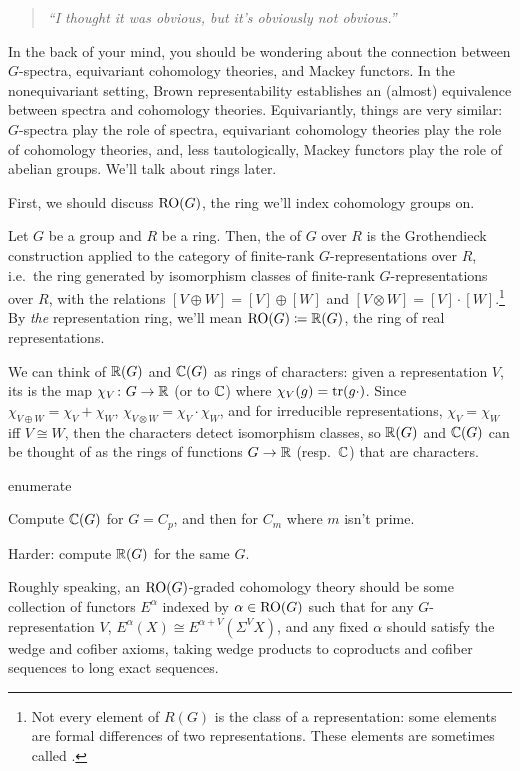 \begin{quote}\textit{
	``I thought it was obvious, but it's obviously not obvious.''
}\end{quote}
In the back of your mind, you should be wondering about the connection between $G$-spectra, equivariant cohomology
theories, and Mackey functors. In the nonequivariant setting, Brown representability establishes an (almost)
equivalence between spectra and cohomology theories. Equivariantly, things are very similar: $G$-spectra play the
role of spectra, equivariant cohomology theories play the role of cohomology theories, and, less tautologically,
Mackey functors play the role of abelian groups. We'll talk about rings later.

First, we should discuss $\mathrm{RO}(G)$, the ring we'll index cohomology groups on.
\begin{defn}
Let $G$ be a group and $R$ be a ring. Then, the  of $G$ over $R$ is the Grothendieck
construction applied to the category of finite-rank $G$-representations over $R$, i.e.\ the ring generated by
isomorphism classes of finite-rank $G$-representations over $R$, with the relations $[V\oplus W] = [V]\oplus [W]$
and $[V\otimes W] = [V]\cdot [W]$.\footnote{Not every element of $R(G)$ is the class of a representation: some
elements are formal differences of two representations. These elements are sometimes called .} By \emph{the} representation ring, we'll mean
$\mathrm{RO}(G)\coloneqq\mathbb R(G)$, the ring of real representations.
\end{defn}
We can think of $\mathbb R(G)$ and $\mathbb C(G)$ as rings of characters: given a representation $V$, its  is the
map $\chi_V\colon G\to\mathbb R$ (or to $\mathbb C$) where $\chi_V(g) = \operatorname{tr}(g\cdot)$. Since $\chi_{V\oplus W} = \chi_V + \chi_W$,
$\chi_{V\otimes W} = \chi_V\cdot\chi_W$, and for irreducible representations, $\chi_V = \chi_W$ iff $V\cong W$,
then the characters detect isomorphism classes, so $\mathbb R(G)$ and $\mathbb C(G)$ can be thought of as the rings of functions
$G\to\mathbb R$ (resp.\ $\mathbb C$) that are characters.
\begin{comp}{ex}{enumerate}
	\item Compute $\mathbb C(G)$ for $G = C_p$, and then for $C_m$ where $m$ isn't prime.
	\item Harder: compute $\mathbb R(G)$ for the same $G$.
\end{comp}
Roughly speaking, an $\mathrm{RO}(G)$-graded cohomology theory should be some collection of functors $E^\alpha$ indexed by
$\alpha\in\mathrm{RO}(G)$ such that for any $G$-representation $V$, $E^\alpha(X) \cong E^{\alpha+V}(\Sigma^V X)$, and any
fixed $\alpha$ should satisfy the wedge and cofiber axioms, taking wedge products to coproducts and cofiber
sequences to long exact sequences.

